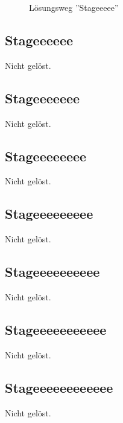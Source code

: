\documentclass[12pt,a4paper,titlepage,oneside]{scrartcl}
\begin{document}
  \begin{figure}[h!]
    \centering
    \caption{Lösungsweg ''Stageeeee''}
    \label{fig:stageeeee_solution}
  \end{figure}

\newpage

\subsection{Stageeeeee}
Nicht gelöst.

\subsection{Stageeeeeee}
Nicht gelöst.

\subsection{Stageeeeeeee}
Nicht gelöst.

\subsection{Stageeeeeeeee}
Nicht gelöst.

\subsection{Stageeeeeeeeee}
Nicht gelöst.

\subsection{Stageeeeeeeeeee}
Nicht gelöst.

\subsection{Stageeeeeeeeeeee}
Nicht gelöst.
\end{document}
